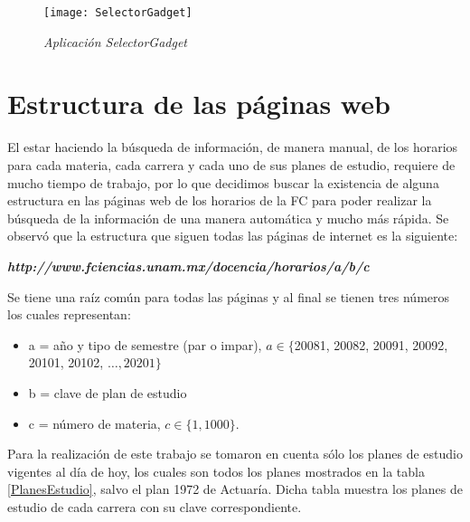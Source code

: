 \begin{figure}[H]
\centering
\texttt{[image: SelectorGadget]} %
\caption{\textit{Aplicación SelectorGadget}}\label{appSelectorGadget}
\end{figure}

\section{Estructura de las páginas web}

El estar haciendo la búsqueda de información, de manera manual, de los horarios para cada materia, cada carrera y cada uno de sus planes de estudio, requiere de mucho tiempo de trabajo, por lo que decidimos buscar la existencia de alguna estructura en las páginas web de los horarios de la FC para poder realizar la búsqueda de la información de una manera automática y mucho más rápida. Se observó que la estructura que siguen todas las páginas de internet es la siguiente:

\begin{center}
\textit{\textbf{http://www.fciencias.unam.mx/docencia/horarios/a/b/c}}
\end{center}

Se tiene una raíz común para todas las páginas y al final se tienen tres números los cuales representan:

\begin{itemize}
\item[ ] a = año y tipo de semestre (par o impar), $a \in \{$20081, 20082, 20091, 20092, 20101, 20102, $\ldots, 20201\}$

\item[ ] b = clave de plan de estudio

\item[ ] c = número de materia, $c \in \{1,1000\}$.
\end{itemize}

Para la realización de este trabajo se tomaron en cuenta sólo los planes de estudio vigentes al día de hoy, los cuales son todos los planes mostrados en la tabla \ref{PlanesEstudio}, salvo el plan 1972 de Actuaría. Dicha tabla muestra los planes de estudio de cada carrera con su clave correspondiente.

